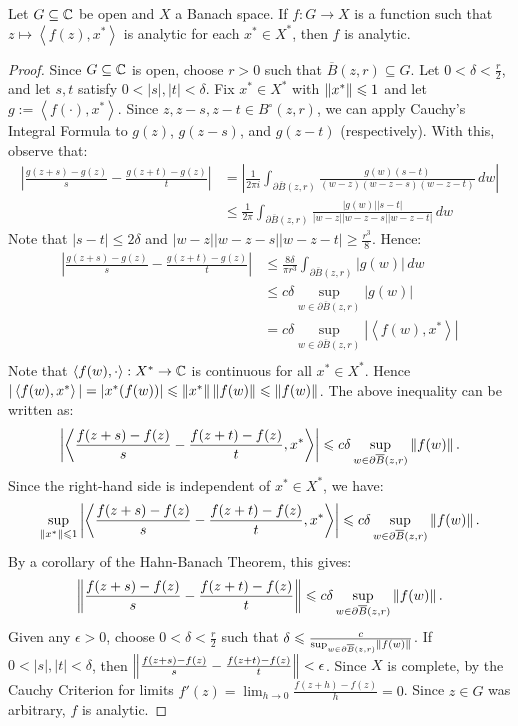 \documentclass[reqno]{amsart}
\begin{document}
\begin{proposition}
	Let $G \subseteq \mathbb{C}$ be open and $X$ a Banach space. If $f:G \rightarrow X$ is a function such that $z \mapsto \left<f(z),x^\ast \right>$ is analytic for each $x^\ast \in X^\ast$, then $f$ is analytic.
\end{proposition}
	\begin{proof}
		Since $G \subseteq \mathbb{C}$ is open, choose $r > 0$ such that $\overline{B}(z,r) \subseteq G$. Let $0 < \delta < \frac{r}{2}$, and let $s,t$ satisfy $0 < |s|,|t| < \delta$. Fix $x^\ast \in X^\ast$ with $\left\lVert x^\ast \right\rVert \leqslant 1$ and let $g:= \left<f(\cdot),x^\ast \right>$. Since $z,z-s,z-t \in B^\circ(z,r)$, we can apply Cauchy's Integral Formula to $g(z)$, $g(z-s)$, and $g(z-t)$ (respectively). With this, observe that:
		\begin{align*}
			\left| \frac{g(z+s) - g(z)}{s} - \frac{g(z+t) - g(z)}{t} \right| 
			&= \left| \frac{1}{2\pi i} \int_{\partial \overline{B}(z,r)}^{} \frac{g(w)(s-t)}{(w-z)(w-z-s)(w-z-t)}\,dw \right|  \\
			&\leq \frac{1}{2 \pi} \int_{\partial \overline{B}(z,r)}^{} \frac{|g(w)| |s-t|}{|w-z||w-z-s||w-z-t|}\,dw 
		\end{align*}
		Note that $|s - t| \leq 2\delta$ and $|w-z||w-z-s||w-z-t| \geq \frac{r^3}{8}$. Hence:
		\begin{align*}
			\left| \frac{g(z+s) - g(z)}{s} - \frac{g(z+t) - g(z)}{t} \right| 
			&\leq \frac{8\delta}{\pi r^3} \int_{\partial \overline{B}(z,r)}^{} |g(w)|\,dw \\
			&\leq c \delta \sup_{w \in \partial \overline{B}(z,r)} |g(w)| \\
			&= c\delta \sup_{w \in \partial \overline{B}(z,r)}|\left<f(w),x^\ast \right>| \\
		\end{align*}
		Note that $\left<f(w),\cdot \right>:X^\ast \rightarrow \mathbb{C}$ is continuous for all $x^\ast \in X^\ast$. Hence $|\left<f(w),x^\ast \right>| = |x^\ast(f(w))| \leqslant \left\lVert x^\ast \right\rVert \left\lVert f(w) \right\rVert \leqslant \left\lVert f(w) \right\rVert$. The above inequality can be written as:
		\[
			\left| \left<\frac{f(z+s) - f(z)}{s} - \frac{f(z+t) - f(z)}{t}, x^\ast \right> \right| \leqslant c\delta \sup_{w \in \partial \overline{B}(z,r)}\left\lVert f(w) \right\rVert.
		\] 
		Since the right-hand side is independent of $x^\ast \in X^\ast$, we have:
		\[
			\sup_{\left\lVert x^\ast \right\rVert \leqslant 1}\left| \left<\frac{f(z+s) - f(z)}{s} - \frac{f(z+t) - f(z)}{t}, x^\ast \right> \right| \leqslant c\delta \sup_{w \in \partial \overline{B}(z,r)}\left\lVert f(w) \right\rVert.
		\] 
		By a corollary of the Hahn-Banach Theorem, this gives:
		\[
			\left\lVert \frac{f(z+s) - f(z)}{s} - \frac{f(z+t) - f(z)}{t} \right\rVert \leqslant c\delta \sup_{w \in \partial \overline{B}(z,r)}\left\lVert f(w) \right\rVert.
		\]
		Given any $\epsilon>0$, choose $0 < \delta < \frac{r}{2}$ such that $\delta \leqslant \frac{c}{\sup_{w \in \partial \overline{B}(z,r)}\left\lVert f(w) \right\rVert}$. If $0 < |s|,|t| < \delta$, then $\left\lVert \frac{f(z+s) - f(z)}{s} - \frac{f(z+t) - f(z)}{t} \right\rVert < \epsilon$. Since $X$ is complete, by the Cauchy Criterion for limits $f'(z) = \lim_{h \rightarrow 0}\frac{f(z+h) - f(z)}{h} = 0$. Since $z \in G$ was arbitrary, $f$ is analytic.
	\end{proof}
\end{document}
